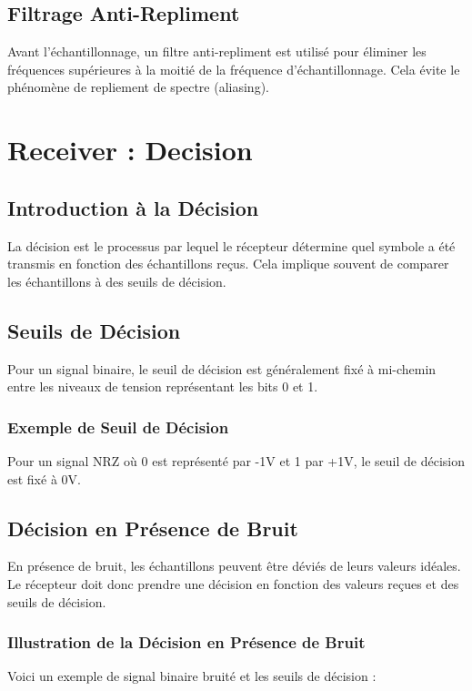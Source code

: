 \documentclass[10pt,a4paper]{article}
\begin{document}
\subsection*{Filtrage Anti-Repliment}
Avant l'échantillonnage, un filtre anti-repliment est utilisé pour éliminer les fréquences supérieures à la moitié de la fréquence d'échantillonnage. Cela évite le phénomène de repliement de spectre (aliasing).

\section*{Receiver : Decision}

\subsection*{Introduction à la Décision}
La décision est le processus par lequel le récepteur détermine quel symbole a été transmis en fonction des échantillons reçus. Cela implique souvent de comparer les échantillons à des seuils de décision.

\subsection*{Seuils de Décision}
Pour un signal binaire, le seuil de décision est généralement fixé à mi-chemin entre les niveaux de tension représentant les bits 0 et 1.

\subsubsection*{Exemple de Seuil de Décision}
Pour un signal NRZ où 0 est représenté par -1V et 1 par +1V, le seuil de décision est fixé à 0V.

\subsection*{Décision en Présence de Bruit}
En présence de bruit, les échantillons peuvent être déviés de leurs valeurs idéales. Le récepteur doit donc prendre une décision en fonction des valeurs reçues et des seuils de décision.

\subsubsection*{Illustration de la Décision en Présence de Bruit}
Voici un exemple de signal binaire bruité et les seuils de décision :
\end{document}
